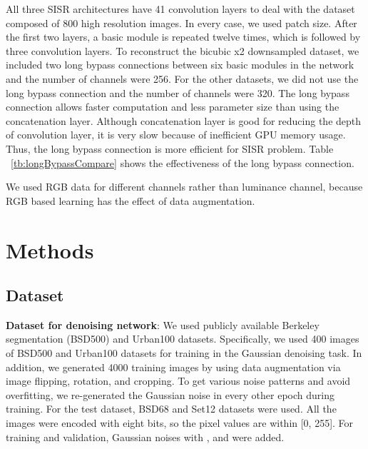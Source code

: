 \documentclass[10pt,twocolumn,letterpaper]{article}
\begin{document}
All three SISR architectures have 41 convolution layers to deal with the dataset composed of 800 high resolution images. In every case, we used  patch size.
After the first two layers, a basic module is repeated twelve times, which is followed by three convolution layers.
To reconstruct the bicubic x2 downsampled dataset, we included two long bypass connections between six basic modules in the network and the number of channels were 256. For the other datasets, we did not use the long bypass connection and the number of channels were 320.
The long bypass connection allows faster computation and less parameter size than using the concatenation layer. Although concatenation layer is good for reducing the depth of convolution layer, it is very slow because of inefficient GPU memory usage. Thus, the long bypass connection is more efficient for SISR problem. Table ~\ref{tb:longBypassCompare} shows the effectiveness of the long bypass connection.


We used RGB data for different channels rather than luminance channel, because RGB based learning has the effect of data augmentation.



\begin{table}[!h]
\begin{center}
\end{center}
\caption{The effectiveness of the long bypass layer in terms of PSNR/SSIM. This result was calculated from 50 validation data of DIV2K dataset.}
\label{tb:longBypassCompare}
\end{table}

\section{Methods}
\label{sec:exp}

\subsection{Dataset}
{\bf Dataset for denoising network}:
We used publicly available Berkeley segmentation (BSD500) \cite{chen2015trainable} and Urban100 \cite{huang2015single} datasets. 
Specifically, we used 400 images of BSD500 and Urban100 datasets for training in the Gaussian denoising task. In addition, we generated 4000 training images by using data augmentation via image flipping, rotation, and cropping. To get various noise patterns and avoid overfitting, we re-generated the Gaussian noise in every other epoch during training. For the test dataset, BSD68 and Set12 datasets were used. 
All the images were encoded with eight bits, so the pixel values are within [0, 255].
For training and validation, Gaussian noises with , and  were added.
\end{document}
